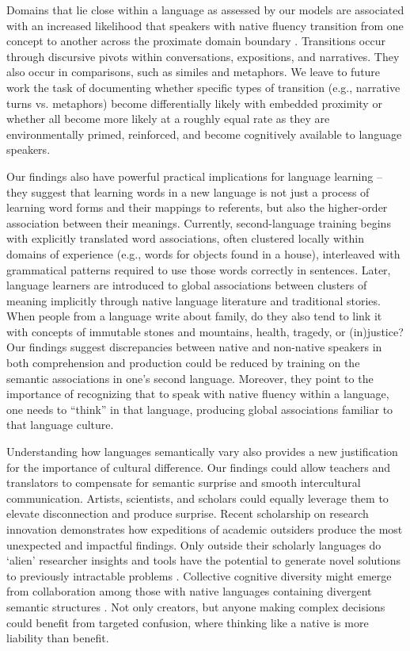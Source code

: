 \documentclass[9pt,twocolumn,twoside,lineno]{pnas-new}
\begin{document}
Domains that lie close within a language as assessed by our models are associated with an increased likelihood that speakers with native fluency transition from one concept to another across the proximate domain boundary \cite{arora2015random}. Transitions occur through discursive pivots within conversations, expositions, and narratives. They also occur in comparisons, such as similes and metaphors. We leave to future work the task of documenting whether specific types of transition (e.g., narrative turns vs. metaphors) become differentially likely with embedded proximity or whether all become more likely at a roughly equal rate as they are environmentally primed, reinforced, and become cognitively available to language speakers. 

Our findings also have powerful practical implications for language learning -- they suggest that learning words in a new language is not just a process of learning word forms and their mappings to referents, but also the higher-order association between their meanings. Currently, second-language training begins with explicitly translated word associations, often clustered locally within domains of experience (e.g., words for objects found in a house), interleaved with grammatical patterns required to use those words correctly in sentences. Later, language learners are introduced to global associations between clusters of meaning implicitly through native language literature and traditional stories. When people from a language write about family, do they also tend to link it with concepts of immutable stones and mountains, health, tragedy, or (in)justice? Our findings suggest discrepancies between native and non-native speakers in both comprehension and production could be reduced by training on the semantic associations in one's second language. Moreover, they point to the importance of recognizing that to speak with native fluency within a language, one needs to ``think'' in that language, producing global associations familiar to that language culture. 

Understanding how languages semantically vary also provides a new justification for the importance of cultural difference. Our findings could allow teachers and translators to compensate for semantic surprise and smooth intercultural communication. Artists, scientists, and scholars could equally leverage them to elevate disconnection and produce surprise. Recent scholarship on research innovation demonstrates how expeditions of academic outsiders produce the most unexpected and impactful findings. Only outside their scholarly languages do `alien' researcher insights and tools have the potential to generate novel solutions to previously intractable problems \cite{shi2023surprising}. Collective cognitive diversity might emerge from collaboration among those with native languages containing divergent semantic structures \cite{freeman2014collaboration}. Not only creators, but anyone making complex decisions could benefit from targeted confusion, where thinking like a native is more liability than benefit. 
\end{document}
